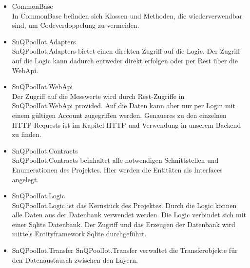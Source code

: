 \begin{itemize}
    \item CommonBase
    \\
    In CommonBase befinden sich Klassen und Methoden, die wiederverwendbar sind, um Codeverdoppelung zu vermeiden.
\end{itemize}


\begin{itemize}
    \item SnQPoolIot.Adapters
    \\
    SnQPoolIot.Adapters bietet einen direkten Zugriff auf die Logic.
Der Zugriff auf die Logic kann dadurch entweder direkt erfolgen oder per Rest über die WebApi.
\end{itemize}

\begin{itemize}
    \item SnQPoolIot.WebApi
    \\
    Der Zugriff auf die Messwerte wird durch Rest-Zugriffe in SnQPoolIot.WebApi provided.
    Auf die Daten kann aber nur per Login mit einem gültigen Account zugegriffen werden.
    Genaueres zu den einzelnen HTTP-Requests ist im Kapitel HTTP und Verwendung in unserem Backend zu finden.
\end{itemize}

\begin{itemize}
    \item SnQPoolIot.Contracts
    \\
    SnQPoolIot.Contracts beinhaltet alle notwendigen Schnittstellen und Enumerationen des Projektes.
    Hier werden die Entitäten als Interfaces angelegt.
\end{itemize}


\begin{itemize}
    \item SnQPoolIot.Logic
    \\
    SnQPoolIot.Logic ist das Kernstück des Projektes. 
    Durch die Logic können alle Daten aus der Datenbank verwendet werden. 
    Die Logic verbindet sich mit einer Sqlite Datenbank. Der Zugriff und das Erzeugen der Datenbank wird mittels Entityframework.Sqlite durchgeführt.
\end{itemize}

\begin{itemize}
    \item SnQPoolIot.Transfer
    SnQPoolIot.Transfer verwaltet die Transferobjekte für den Datenaustausch zwischen den Layern.
\end{itemize}


